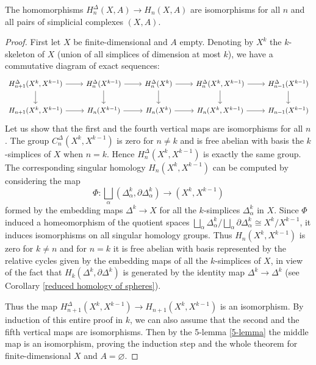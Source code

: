 \documentclass[english,letterpaper]{article}%
\numberwithin{equation}{section}
\numberwithin{figure}{section}
\numberwithin{table}{section}
\theoremstyle{definition}
\theoremstyle{definition}
\theoremstyle{definition}
\theoremstyle{plain}
\theoremstyle{plain}
\theoremstyle{plain}
\theoremstyle{plain}
\theoremstyle{remark}
\theoremstyle{remark}
\begin{document}
\begin{thm}
    The homomorphisms $H^\Delta_n(X,A)\to H_n(X,A)$ are isomorphisms for all $n$ and all pairs of simplicial complexes $(X,A)$.
\end{thm}
\begin{proof}
     First let $X$ be finite-dimensional and $A$ empty. Denoting by $X^k$ the $k$-skeleton of $X$ (union of all simplices of dimension at most $k$), we have a commutative diagram of exact sequences:
     \[\begin{tikzcd}
        H^\Delta_{n+1}(X^k,X^{k-1})\arrow[r]\arrow[d] & H^\Delta_{n}(X^{k-1})\arrow[r]\arrow[d] & H^\Delta_{n}(X^k) \arrow[r]\arrow[d] & H^\Delta_{n}(X^k,X^{k-1})\arrow[d]\arrow[r] & H^\Delta_{n-1}(X^{k-1})\arrow[d] \\
       H_{n+1}(X^k,X^{k-1})\arrow[r] & H_{n}(X^{k-1})\arrow[r] & H_n(X^k)\arrow[r] &H_n(X^k,X^{k-1}) \arrow[r] &H_{n-1}(X^{k-1}) 
    \end{tikzcd}\]
    Let us show that the first and the fourth vertical maps are isomorphisms for all $n$. The group $C_n^\Delta(X^k,X^{k-1})$ is zero for $n\neq k$ and is free abelian with basis the $k$-simplices of $X$ when $n=k$. Hence $H_n^\Delta(X^k,X^{k-1})$ is exactly the same group. The corresponding singular homology $H_n(X^k,X^{k-1})$ can be computed by considering the map
    \[\Phi:\bigsqcup_\alpha (\Delta_\alpha^k,\partial\Delta_\alpha^k)\to (X^k,X^{k-1})\]
    formed by the embedding maps $\Delta^k\to X$ for all the $k$-simplices $\Delta_\alpha^k$ in $X$. Since $\Phi$ induced a homeomorphism of the quotient spaces $\bigsqcup_\alpha \Delta^k_\alpha/\bigsqcup_\alpha \partial\Delta_\alpha^k\cong X^k/X^{k-1}$, it induces isomorphisms on all singular homology groups. Thus $H_n(X^k,X^{k-1})$ is zero for $k\neq n$ and for $n=k$ it is free abelian with basis represented by the relative cycles given by the embedding maps of all the $k$-simplices of $X$, in view of the fact that $H_k(\Delta^k,\partial\Delta^k)$ is generated by the identity map $\Delta^k\to \Delta^k$ (see Corollary \ref{reduced homology of spheres}).
    
    Thus the map $ H_{n+1}^\Delta(X^k,X^{k-1})\to  H_{n+1}(X^k,X^{k-1})$ is an isomorphism. By induction of this entire proof in $k$, we can also assume that the second and the fifth vertical maps are isomorphisms. Then by the 5-lemma \ref{5-lemma} the middle map is an isomorphism, proving the induction step and the whole theorem for finite-dimensional $X$ and $A=\varnothing$.
    

\end{proof}
\end{document}
